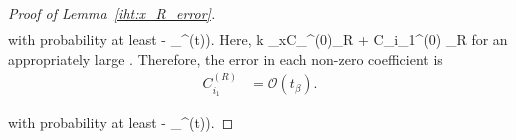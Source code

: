 \documentclass{article}
\def\[#1\]{{$#1$}}
\begin{document}
\begin{proof}[Proof of Lemma~\ref{iht:x_R_error}]
\begin{align*}
\end{align*}
with probability at least \[(1 - \delta_{\beta}^{(t)})\]. Here, \[{(R + 1)}k \eta_xC_{\max}^{(0)}\delta_{R} + C_{i_1}^{(0)} \delta_{R}  \] for an appropriately large \[R\]. Therefore, the error in each non-zero coefficient is 
\begin{align*}
C_{i_1}^{(R)} &=  \mathcal{O} (t_\beta).

\end{align*}

with probability at least \[(1 - \delta_{\beta}^{(t)})\]. 
\end{proof}
\end{document}
